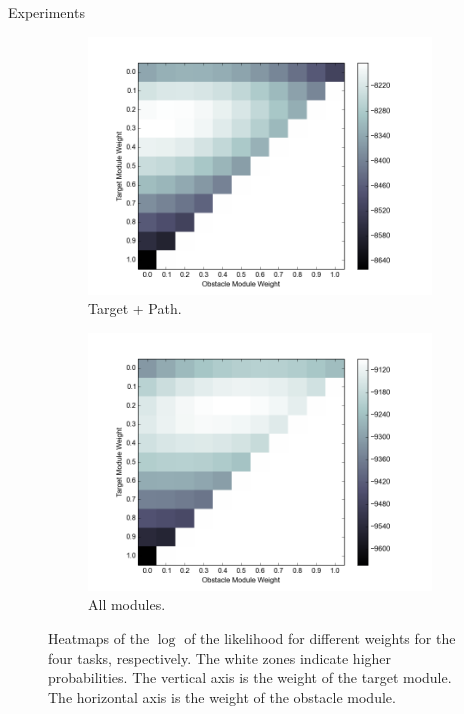 \documentclass[final]{beamer}
\begin{document}
\begin{frame}{}
\begin{textblock}{39}
\begin{block}{Experiments}
\begin{figure}[h]
\begin{subfigure}[b]{0.24\textwidth}
\includegraphics[width=\textwidth]{objValuesTask3.png}
\caption{Target + Path. }
\end{subfigure}
\begin{subfigure}[b]{0.24\textwidth}
\includegraphics[width=\textwidth]{objValuesTask4.png}
\caption{All modules. }
\end{subfigure}
\caption{Heatmaps of the $\log$ of the likelihood for
different weights for the four tasks, respectively. The white zones indicate
higher probabilities. The vertical axis is the weight of the target module. The
horizontal axis is the weight of the obstacle module.
}
\label{fig:heatmap}
\end{figure}
\end{block}


\end{textblock}
\end{frame}
\end{document}
